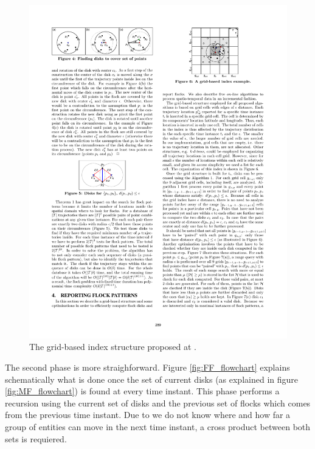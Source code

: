 \begin{figure}
    \centering
    \includegraphics[clip,trim=13cm 21.75cm 4.1cm 1.85cm]{figures/grid}
    \caption{The grid-based index structure proposed at \cite{vieira_2009}.}\label{fig:grid}
\end{figure}

The second phase is more straighforward.  Figure \ref{fig:FF_flowchart} explains schematically what is done once the set of current disks (as explained in figure \ref{fig:MF_flowchart}) is found at every time instant.  This phase performs a recursion using the current set of disks and the previous set of flocks which comes from the  previous time instant.  Due to we do not know where and how far a group of entities can move in the next time instant, a cross product between both sets is requiered.  

